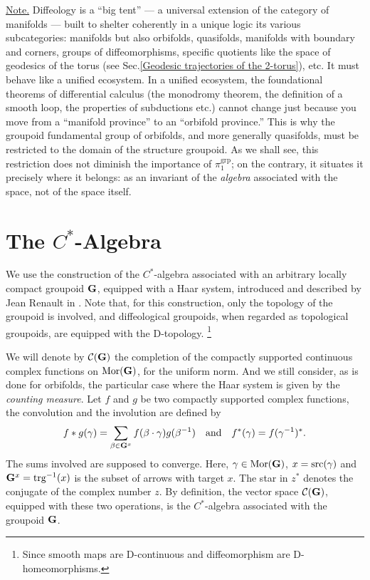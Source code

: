 \uline{Note.} Diffeology is a ``big tent''
--- a universal extension of the category of manifolds ---
built to shelter coherently in a unique logic its various subcategories:
manifolds but also orbifolds, quasifolds, manifolds with boundary and corners,
groups of diffeomorphisms, specific quotients like the space of geodesics of the torus (see Sec.\ref{Geodesic trajectories of the 2-torus}), etc.
It must behave like a unified ecosystem.
In a unified ecosystem,
the foundational theorems of differential calculus
(the monodromy theorem, the definition of a smooth loop, the properties of subductions etc.)
cannot change just because you move from a ``manifold province'' to an ``orbifold province.''
This is why the groupoid fundamental group of orbifolds,
and more generally quasifolds,
must be restricted to the domain of the structure groupoid.
As we shall see,
this restriction does not diminish the importance of $\pi_1^{\text{grp}}$;
on the contrary,
it situates it precisely where it belongs:
as an invariant of the \emph{algebra} associated with the space,
not of the space itself.

\section{The $C^*$-Algebra}

We use the construction of the $C^*$-algebra associated with an arbitrary locally compact groupoid ${\mathbf G}$,
equipped with a Haar system,
introduced and described by Jean Renault in \cite[Part II, \textsection\,1]{JR80}.
Note that,
for this construction,
only the topology of the groupoid is involved,
and diffeological groupoids,
when regarded as topological groupoids,
are equipped with the D-topology.%
\footnote{Since smooth maps are D-continuous and diffeomorphism are D-homeomorphisms.}

We will denote by $\mathcal{C}({\mathbf G})$ the completion of the compactly supported continuous complex functions on ${\operatorname{Mor}}({\mathbf G})$,
for the uniform norm.
And we still consider, as is done for orbifolds, the particular case where the Haar system is given by the \emph{counting measure}.
Let $f$ and $g$ be two compactly supported complex functions,
the convolution and the involution are defined by
\begin{equation*}%
  f*g(\gamma) = \sum_{\beta \in \GG^x} f(\beta \cdot \gamma)g(\beta^{-1})
  \quad \mbox{and} \quad f^*(\gamma) = f(\gamma^{-1})^*.
\end{equation*}
The sums involved are supposed to converge.
Here,
$\gamma \in {\operatorname{Mor}}({\mathbf G})$,
$x = \mathrm{src} (\gamma)$ and
${\mathbf G}^x = \mathrm{trg}^{-1}(x)$ is the subset of arrows with target $x$.
The star in $z^*$ denotes the conjugate of the complex number $z$.
By definition,
the vector space $\mathcal{C}({\mathbf G})$,
equipped with these two operations,
is the $C^*$-algebra associated with the groupoid ${\mathbf G}$.

